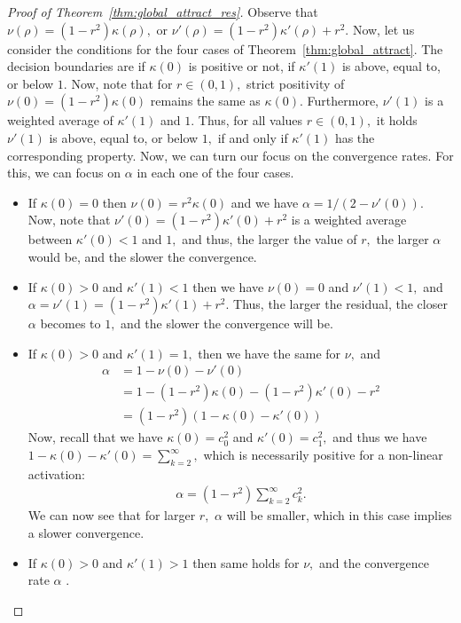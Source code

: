\documentclass[twoside]{article}
\theoremstyle{definition}
\begin{document}
\begin{proof}[Proof of Theorem~\ref{thm:global_attract_res}]
Observe that $\nu(\rho) = (1-r^2) \kappa(\rho),$ or $\nu'(\rho) = (1-r^2) \kappa'(\rho) + r^2.$ Now, let us consider the conditions for the four cases of Theorem~\ref{thm:global_attract}. The decision boundaries are if $\kappa(0)$ is positive or not, if $\kappa'(1)$ is above, equal to, or below $1.$ Now, note that for $r \in (0,1),$ strict positivity of $\nu(0) = (1-r^2) \kappa(0)$ remains the same as $\kappa(0).$ Furthermore, $\nu'(1)$ is a weighted average of $\kappa'(1)$ and $1.$ Thus, for all values $r\in(0,1),$ it holds $\nu'(1)$ is above, equal to, or below $1,$ if and only if $\kappa'(1)$ has the corresponding property.  Now, we can turn our focus on the convergence rates. For this, we can focus on $\alpha$ in each one of the four cases. 
\begin{itemize}
    \item If $\kappa(0)=0$ then $\nu(0) = r^2 \kappa(0)$ and we have $\alpha = 1 / (2-\nu'(0)).$ Now, note that $\nu'(0) = (1-r^2)\kappa'(0) +  r^2$ is a weighted average between $\kappa'(0) < 1$ and $1,$ and thus, the larger the value of $r,$ the larger $\alpha$ would be, and the slower the convergence. 
    \item If $\kappa(0)>0$ and $\kappa'(1)<1$ then we have $\nu(0)=0$ and $\nu'(1) < 1,$ and $\alpha = \nu'(1) = (1-r^2) \kappa'(1) + r^2.$ Thus, the larger the residual, the closer $\alpha$ becomes to $1,$ and the slower the convergence will be.  
    \item If $\kappa(0)>0$ and $\kappa'(1)=1,$ then we have the same for $\nu,$ and 
    \begin{align*}
        \alpha &= 1 - \nu(0) - \nu'(0)\\
        &= 1 - (1-r^2) \kappa(0) - (1-r^2)\kappa'(0) - r^2\\
        &= (1-r^2 )( 1 - \kappa(0) - \kappa'(0))
    \end{align*}
    Now, recall that we have $\kappa(0) = c_0^2$ and $\kappa'(0)=c_1^2,$ and thus we have $1-\kappa(0) - \kappa'(0) = \sum_{k=2}^\infty,$ which is necessarily positive for a non-linear activation:
    \begin{align*}
        \alpha = (1-r^2) \sum_{k=2}^\infty c_k^2.
    \end{align*}
    We can now see that for larger $r,$ $\alpha $ will be smaller, which in this case implies a slower convergence. 
    \item If $\kappa(0)>0$ and $\kappa'(1) > 1$ then same holds for $\nu,$ and the convergence rate $\alpha$ .
\end{itemize}

\end{proof}
\end{document}
